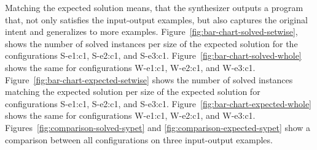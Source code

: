 Matching the expected solution means, that the synthesizer outputs a program
that, not only satisfies the input-output examples, but also captures the
original intent and generalizes to more examples.
Figure~\ref{fig:bar-chart-solved-setwise}, shows the number of solved instances
per size of the expected solution for the configurations S-e1:c1, S-e2:c1, and
S-e3:c1.
Figure~\ref{fig:bar-chart-solved-whole} shows the same for configurations
W-e1:c1, W-e2:c1, and W-e3:c1.
Figure~\ref{fig:bar-chart-expected-setwise} shows the number of solved instances
matching the expected solution per size of the expected solution for
configurations S-e1:c1, S-e2:c1, and S-e3:c1.
Figure~\ref{fig:bar-chart-expected-whole} shows the same for configurations
W-e1:c1, W-e2:c1, and W-e3:c1.
Figures~\ref{fig:comparison-solved-sypet} and
\ref{fig:comparison-expected-sypet} show a comparison between all configurations
on three input-output examples.

\begin{table}[]
  \noindent{}
  \caption{Comparison between the different configurations by number of instances
    solved and running wall-clock time for solved instances (not necessarily
    matching the expected solution).}
  \label{table:comparison-configs}
\end{table}

